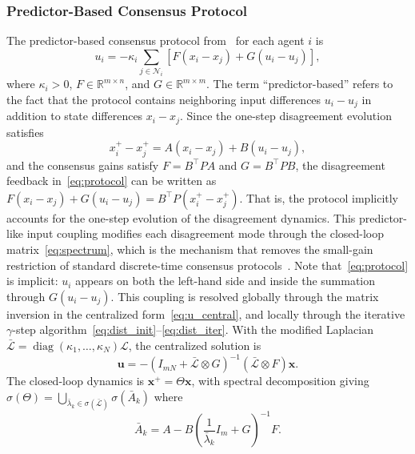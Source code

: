 \documentclass[12pt]{elsarticle}
\theoremstyle{remark}
\DeclareMathOperator{\diag}{diag}
\newcommand{\R}{\mathbb{R}}
\newcommand{\bx}{\boldsymbol{x}}
\newcommand{\bu}{\boldsymbol{u}}
\begin{document}
\subsubsection{Predictor-Based Consensus Protocol}
\label{subsec:protocol}
The predictor-based consensus protocol from~\cite{cacace2024} for each agent $i$ is
\begin{equation}
u_i = -\kappa_i \sum_{j \in \mathcal{N}_i} \left[ F(x_i - x_j) + G(u_i - u_j) \right],
\label{eq:protocol}
\end{equation}
where $\kappa_i > 0$, $F \in \R^{m \times n}$, and $G \in \R^{m \times m}$. The term ``predictor-based'' refers to the fact that the protocol contains neighboring input differences $u_i - u_j$ in addition to state differences $x_i - x_j$. Since the one-step disagreement evolution satisfies
\begin{equation}
x_i^+ - x_j^+ = A(x_i - x_j) + B(u_i - u_j),
\label{eq:predictor_interp}
\end{equation}
and the consensus gains satisfy $F = B^\top P A$ and $G = B^\top P B$, the disagreement feedback in~\eqref{eq:protocol} can be written as $F(x_i - x_j) + G(u_i - u_j) = B^\top P(x_i^+ - x_j^+)$. That is, the protocol implicitly accounts for the one-step evolution of the disagreement dynamics. This predictor-like input coupling modifies each disagreement mode through the closed-loop matrix~\eqref{eq:spectrum}, which is the mechanism that removes the small-gain restriction of standard discrete-time consensus protocols~\cite{ma2015}. Note that~\eqref{eq:protocol} is implicit: $u_i$ appears on both the left-hand side and inside the summation through $G(u_i - u_j)$. This coupling is resolved globally through the matrix inversion in the centralized form~\eqref{eq:u_central}, and locally through the iterative $\gamma$-step algorithm~\eqref{eq:dist_init}--\eqref{eq:dist_iter}.
With the modified Laplacian $\bar{\mathcal{L}} = \diag(\kappa_1,\ldots,\kappa_N) \mathcal{L}$, the centralized solution is
\begin{equation}
\bu = -(I_{mN} + \bar{\mathcal{L}} \otimes G)^{-1}(\bar{\mathcal{L}} \otimes F)\bx.
\label{eq:u_central}
\end{equation}
The closed-loop dynamics is $\bx^+ = \Theta \bx$, with spectral decomposition \cite[Lemma~3.1]{cacace2024} giving $\sigma(\Theta) = \bigcup_{\bar{\lambda}_k \in \sigma(\bar{\mathcal{L}})} \sigma(\bar{A}_k)$ where
\begin{equation}
\bar{A}_k = A - B\left(\frac{1}{\bar{\lambda}_k}I_m + G\right)^{-1}F.
\label{eq:spectrum}
\end{equation}
\end{document}
